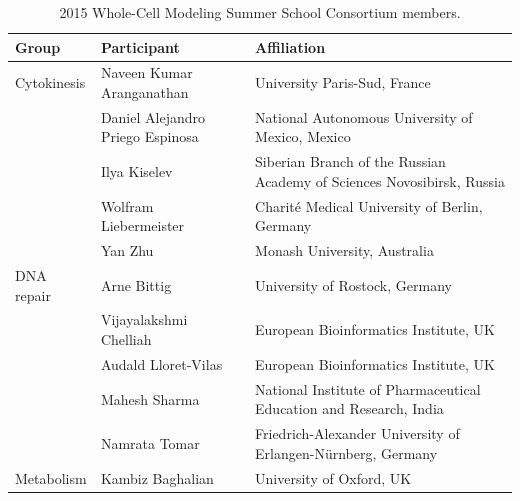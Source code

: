 \documentclass[journal,transmag]{IEEEtran}
\begin{document}

\vfill



\clearpage
\setcounter{table}{0}
\renewcommand{\thetable}{S\Roman{table}}

\begin{table}[ht!]
\caption{2015 Whole-Cell Modeling Summer School Consortium members.}
\begin{tabularx}{\textwidth}{l||l||X}\hline
\bfseries Group        & \bfseries Participant            & \bfseries Affiliation\\\hline\hline
Cytokinesis            & Naveen Kumar Aranganathan        & University Paris-Sud, France\\
                       & Daniel Alejandro Priego Espinosa & National Autonomous University of Mexico, Mexico\\
                       & Ilya Kiselev                     & Siberian Branch of the Russian Academy of Sciences Novosibirsk, Russia\\
                       & Wolfram Liebermeister            & Charit\'e Medical University of Berlin, Germany\\
                       & Yan Zhu                          & Monash University, Australia\\\hline
DNA repair             & Arne Bittig                      & University of Rostock, Germany\\
                       & Vijayalakshmi Chelliah           & European Bioinformatics Institute, UK\\
                       & Audald Lloret-Vilas              & European Bioinformatics Institute, UK\\
                       & Mahesh Sharma                    & National Institute of Pharmaceutical Education and Research, India\\
                       & Namrata Tomar                    & Friedrich-Alexander University of Erlangen-N\"urnberg, Germany\\\hline
Metabolism             & Kambiz Baghalian                 & University of Oxford, UK\\

\end{tabularx}
\end{table}
\end{document}
